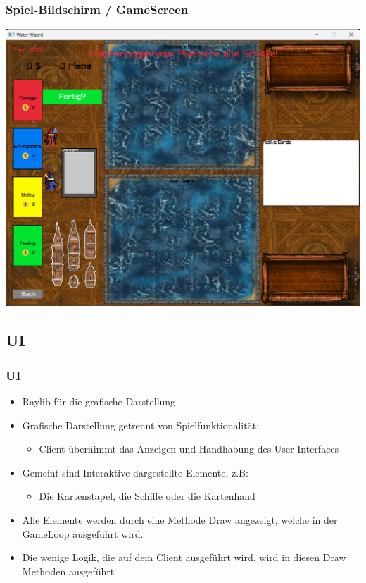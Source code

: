 \documentclass{beamer}
\begin{document}
\begin{frame}
  \frametitle{Spiel-Bildschirm / GameScreen}
  \includegraphics[width=\textwidth]{GameScreen.png}
\end{frame}

\subsection{UI}
\begin{frame}
  \frametitle{UI}
  \begin{itemize}
    \item Raylib für die grafische Darstellung
    \item Grafische Darstellung getrennt von Spielfunktionalität:
      \begin{itemize}
        \item Client übernimmt das Anzeigen und Handhabung des User Interfaces 
      \end{itemize}
    \item Gemeint sind Interaktive dargestellte Elemente, z.B:
    \begin{itemize}
      \item Die Kartenstapel, die Schiffe oder die Kartenhand
    \end{itemize}
    \item Alle Elemente werden durch eine Methode Draw angezeigt, welche in der GameLoop ausgeführt wird.
    \item Die wenige Logik, die auf dem Client ausgeführt wird, wird in diesen Draw Methoden ausgeführt
  \end{itemize} 
\end{frame}
\end{document}
